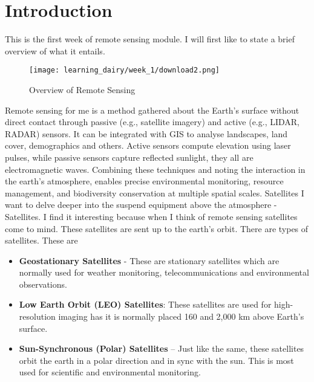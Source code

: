 \documentclass[
  letterpaper,
  DIV=11,
  numbers=noendperiod]{scrreprt}
\providecommand{\tightlist}{%
  \setlength{\itemsep}{0pt}\setlength{\parskip}{0pt}}\usepackage{longtable,booktabs,array}
\begin{document}
\hypertarget{introduction-1}{%
\section{Introduction}\label{introduction-1}}

This is the first week of remote sensing module. I will first like to
state a brief overview of what it entails.

\begin{figure}

{\centering \texttt{[image: learning\_dairy/week\_1/download2.png]}

}

\caption{Overview of Remote Sensing}

\end{figure}

Remote sensing for me is a method gathered about the Earth's surface
without direct contact through passive (e.g., satellite imagery) and
active (e.g., LIDAR, RADAR) sensors. It can be integrated with GIS to
analyse landscapes, land cover, demographics and others. Active sensors
compute elevation using laser pulses, while passive sensors capture
reflected sunlight, they all are electromagnetic waves. Combining these
techniques and noting the interaction in the earth's atmosphere, enables
precise environmental monitoring, resource management, and biodiversity
conservation at multiple spatial scales. Satellites I want to delve
deeper into the suspend equipment above the atmosphere - Satellites. I
find it interesting because when I think of remote sensing satellites
come to mind. These satellites are sent up to the earth's orbit. There
are types of satellites. These are

\begin{itemize}
\tightlist
\item
  \textbf{Geostationary Satellites} - These are stationary satellites
  which are normally used for weather monitoring, telecommunications and
  environmental observations.
\item
  \textbf{Low Earth Orbit (LEO) Satellites}: These satellites are used
  for high-resolution imaging has it is normally placed 160 and 2,000 km
  above Earth's surface.
\item
  \textbf{Sun-Synchronous (Polar) Satellites} -- Just like the same,
  these satellites orbit the earth in a polar direction and in sync with
  the sun. This is most used for scientific and environmental
  monitoring.
\end{itemize}
\end{document}
